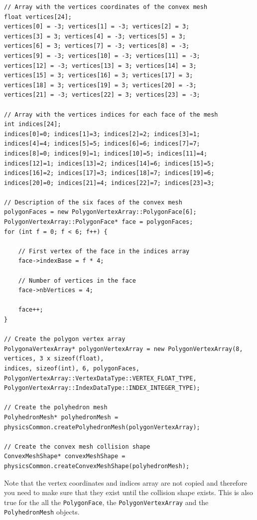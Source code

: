 \documentclass[a4paper,12pt]{article}
\begin{document}
    \begin{lstlisting}
// Array with the vertices coordinates of the convex mesh
float vertices[24];
vertices[0] = -3; vertices[1] = -3; vertices[2] = 3;
vertices[3] = 3; vertices[4] = -3; vertices[5] = 3;
vertices[6] = 3; vertices[7] = -3; vertices[8] = -3;
vertices[9] = -3; vertices[10] = -3; vertices[11] = -3;
vertices[12] = -3; vertices[13] = 3; vertices[14] = 3;
vertices[15] = 3; vertices[16] = 3; vertices[17] = 3;
vertices[18] = 3; vertices[19] = 3; vertices[20] = -3;
vertices[21] = -3; vertices[22] = 3; vertices[23] = -3;

// Array with the vertices indices for each face of the mesh
int indices[24];
indices[0]=0; indices[1]=3; indices[2]=2; indices[3]=1;
indices[4]=4; indices[5]=5; indices[6]=6; indices[7]=7;
indices[8]=0; indices[9]=1; indices[10]=5; indices[11]=4;
indices[12]=1; indices[13]=2; indices[14]=6; indices[15]=5;
indices[16]=2; indices[17]=3; indices[18]=7; indices[19]=6;
indices[20]=0; indices[21]=4; indices[22]=7; indices[23]=3;

// Description of the six faces of the convex mesh
polygonFaces = new PolygonVertexArray::PolygonFace[6];
PolygonVertexArray::PolygonFace* face = polygonFaces;
for (int f = 0; f < 6; f++) {

    // First vertex of the face in the indices array
    face->indexBase = f * 4;   

    // Number of vertices in the face
    face->nbVertices = 4;

    face++;
}

// Create the polygon vertex array
PolygonaVertexArray* polygonVertexArray = new PolygonVertexArray(8, vertices, 3 x sizeof(float),
indices, sizeof(int), 6, polygonFaces,
PolygonVertexArray::VertexDataType::VERTEX_FLOAT_TYPE,
PolygonVertexArray::IndexDataType::INDEX_INTEGER_TYPE);

// Create the polyhedron mesh
PolyhedronMesh* polyhedronMesh = physicsCommon.createPolyhedronMesh(polygonVertexArray);

// Create the convex mesh collision shape
ConvexMeshShape* convexMeshShape = physicsCommon.createConvexMeshShape(polyhedronMesh);
  \end{lstlisting}

    \vspace{0.6cm}

    Note that the vertex coordinates and indices array are not copied and therefore you need to make sure that they exist until the collision shape
    exists. This is also true for the all the \texttt{PolygonFace}, the \texttt{PolygonVertexArray} and the \texttt{PolyhedronMesh} objects. \\
\end{document}
